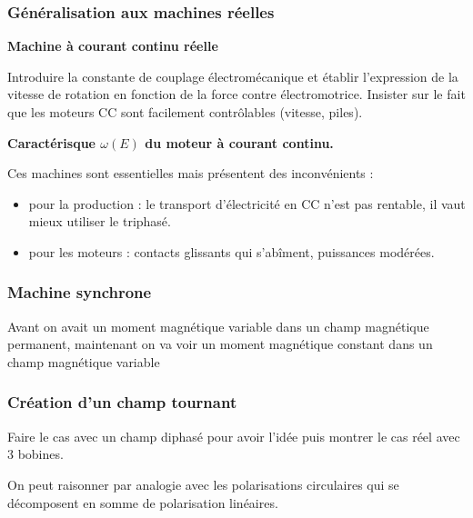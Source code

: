 \subsubsection{Généralisation aux machines réelles}

\begin{slide}
\textbf{Machine à courant continu réelle}
\end{slide}

Introduire la constante de couplage électromécanique et établir l'expression de la vitesse de rotation en fonction de la force contre électromotrice.
Insister sur le fait que les moteurs CC sont facilement contrôlables (vitesse, piles).

\begin{experience}
\textbf{Caractérisque $\omega(E)$ du moteur à courant continu.}
\end{experience}

\begin{transition}
Ces machines sont essentielles mais présentent des inconvénients :
\begin{itemize}
\item pour la production : le transport d'électricité en CC n'est pas rentable, il vaut mieux utiliser le triphasé.
\item pour les moteurs : contacts glissants qui s'abîment, puissances modérées. 
\end{itemize}
\end{transition}

\subsubsection{Machine synchrone}

Avant on avait un moment magnétique variable dans un champ magnétique permanent, maintenant on va voir un moment magnétique constant dans un champ magnétique variable

\subsubsection{Création d'un champ tournant}
\label{sec:lp09_rotating_field}

Faire le cas avec un champ diphasé pour avoir l'idée puis montrer le cas réel avec 3 bobines.

\begin{remarque}
On peut raisonner par analogie avec les polarisations circulaires qui se décomposent en somme de polarisation linéaires.
\end{remarque}

